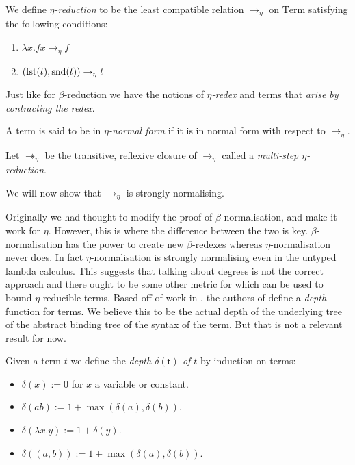 \begin{defin}
    We define \emph{$\eta$-reduction} to be the least compatible relation $\to_{\eta}$ on $\mathrm{Term}$ satisfying the following conditions:
    \begin{enumerate}
        \item $\lambda x . f x \to_{\eta} f$
        \item $(\mathrm{fst}(t), \mathrm{snd}(t)) \to_{\eta} t$
    \end{enumerate}
    Just like for $\beta$-reduction we have the notions of \emph{$\eta$-redex} and terms that \emph{arise by contracting the redex}.
\end{defin}

\begin{defin}
    A term is said to be in \emph{$\eta$-normal form} if it is in normal form with respect to $\to_{\eta}$.
\end{defin}

\begin{defin}
    Let $\twoheadrightarrow_{\eta}$ be the transitive, reflexive closure of $\to_{\eta}$ called a \emph{multi-step $\eta$-reduction}.
\end{defin}

We will now show that $\to_\eta$ is strongly normalising.

\begin{remark}
    Originally we had thought to modify the proof of $\beta$-normal\-isa\-tion, and make it work for $\eta$. However, this is where the difference between the two is key.
    $\beta$-normal\-isa\-tion has the power to create new $\beta$-redexes whereas $\eta$-normalisation never does. In fact $\eta$-normalisation is strongly normalising even in the untyped lambda calculus. This suggests that talking about degrees is not the correct approach and there ought to be some other metric for which can be used to bound $\eta$-reducible terms. Based off of work in \cite{Fortune1983}, the authors of \cite[Ex. 3.21]{Sorensen} define a \emph{depth} function for terms. We believe this to be the actual depth of the underlying tree of the abstract binding tree of the syntax of the term. But that is not a relevant result for now.
\end{remark}

\begin{defin}
    Given a term $t$ we define the \emph{depth $\mathsf{\delta(t)}$ of $t$} by induction on terms:
    \begin{itemize}
        \item $\delta (x):=0$ for $x$ a variable or constant.
        \item $\delta (a b) := 1+ \max(\delta(a), \delta(b))$.
        \item $\delta (\lambda x . y):= 1 + \delta(y)$.
        \item $\delta ((a, b)) := 1 + \max(\delta(a), \delta(b))$.  
    \end{itemize}
\end{defin}

